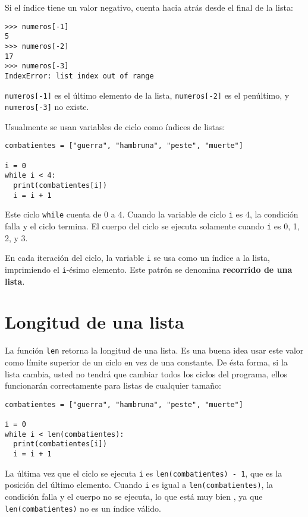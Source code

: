 Si el índice tiene un valor negativo, cuenta hacia atrás desde el
final de la lista:
\begin{lstlisting}
>>> numeros[-1]
5
>>> numeros[-2]
17
>>> numeros[-3]
IndexError: list index out of range
\end{lstlisting}

\texttt{numeros{[}-1{]}} es el último elemento de la lista, \texttt{numeros{[}-2{]}}
es el penúltimo, y \texttt{numeros{[}-3{]}} no existe.

Usualmente se usan variables de ciclo como índices de listas:
\begin{lstlisting}
combatientes = ["guerra", "hambruna", "peste", "muerte"]

i = 0
while i < 4:
  print(combatientes[i])
  i = i + 1
\end{lstlisting}

Este ciclo \texttt{while} cuenta de 0 a 4. Cuando la variable de ciclo
\texttt{i} es 4, la condición falla y el ciclo termina. El cuerpo
del ciclo se ejecuta solamente cuando \texttt{i} es 0, 1, 2, y 3.

En cada iteración del ciclo, la variable \texttt{i} se usa como un
índice a la lista, imprimiendo el \texttt{i}-ésimo elemento. Este
patrón se denomina \textbf{recorrido de una lista}.

 

\section{Longitud de una lista}

 

La función \texttt{len} retorna la longitud de una lista. Es una buena
idea usar este valor como límite superior de un ciclo en vez de una
constante. De ésta forma, si la lista cambia, usted no tendrá que
cambiar todos los ciclos del programa, ellos funcionarán correctamente
para listas de cualquier tamaño:
\begin{lstlisting}
combatientes = ["guerra", "hambruna", "peste", "muerte"]

i = 0
while i < len(combatientes):
  print(combatientes[i])
  i = i + 1
\end{lstlisting}

La última vez que el ciclo se ejecuta \texttt{i} es \texttt{len(combatientes)
- 1}, que es la posición del último elemento. Cuando \texttt{i} es
igual a \texttt{len(combatientes)}, la condición falla y el cuerpo
no se ejecuta, lo que está muy bien , ya que \texttt{len(combatientes)}
no es un índice válido.


